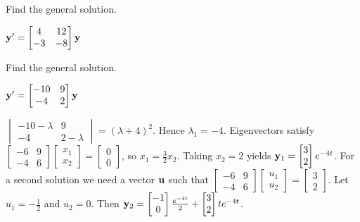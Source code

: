 \documentclass{ximera}
\begin{document}
 \begin{problem}\label{exer:10.5.5}
 Find the general solution.
 
 $ {\bf y}'= \begin{bmatrix}4&12\\-3&-8\end{bmatrix}{\bf y}$
  \end{problem}

 \begin{problem}\label{exer:10.5.6}
 Find the general solution.
 
 $ {\bf
y'}= \begin{bmatrix}-10&9\\-4&2\end{bmatrix}{\bf y}$

\begin{solution}
    $ \begin{vmatrix}-10-\lambda&9\\-4&2-\lambda\end{vmatrix}=(\lambda+4)^2$.
Hence $\lambda_1=-4$.
Eigenvectors   satisfy
$  \begin{bmatrix}-6&9\\-4&6\end{bmatrix} \begin{bmatrix}x_1\\x_2\end{bmatrix}= \begin{bmatrix}0\\0\end{bmatrix}$,
so $x_1=\frac{3}{2}x_2$.  Taking $x_2=2$ yields
${\bf y}_1=  \begin{bmatrix}3\\2\end{bmatrix}e^{-4t}$.
For a second solution we need a vector ${\bf u}$
such that $  \begin{bmatrix}-6&9\\-4&6\end{bmatrix} \begin{bmatrix}u_1\\u_2\end{bmatrix}
= \begin{bmatrix}3\\2\end{bmatrix}$. Let $u_1=-\frac{1}{2}$ and $u_2=0$. Then
${\bf y}_2=  \begin{bmatrix}-1\\0\end{bmatrix}\frac{e^{-4t}}{2}+  \begin{bmatrix}3\\2\end{bmatrix}te^{-4t}$.

\end{solution}
\end{problem}
\end{document}

